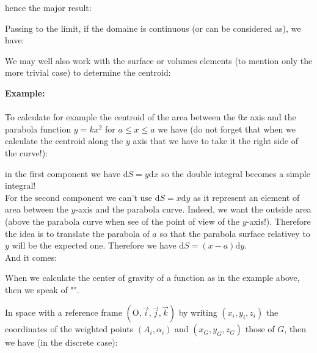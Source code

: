 	hence the major result:
	
	Passing to the limit, if the domaine is continuous (or can be considered as), we have:
	
	We may well also work with the surface or volumes elements (to mention only the more trivial case) to determine the centroid:
	
	\begin{tcolorbox}[colframe=black,colback=white,sharp corners]
	\textbf{{\Large {}}Example:}\\\\
	To calculate for example the centroid of the area between the 0$x$ axis and the parabola function $y=kx^2$ for $a\leq x\leq a$ we have (do not forget that when we calculate the centroid along the $y$ axis that we have to take it the right side of the curve!):
	
	in the first component we have $\mathrm{d}S=y\mathrm{d}x$ so the double integral becomes a simple integral!\\
	
	For the second component we can't use $\mathrm{d}S=x\mathrm{d}y$ as it represent an element of area between the $y$-axis and the parabola curve. Indeed, we want the outside area (above the parabola curve when see of the point of view of the $y$-axis!). Therefore the idea is to translate the parabola of $a$ so that the parabola surface relativey to $y$ will be the expected one. Therefore we have $\mathrm{d}S=(x-a)\mathrm{d}y$.\\
	
	And it comes:
	
	\end{tcolorbox}
	\begin{tcolorbox}[title=Remark,colframe=black,arc=10pt]
	When we calculate the center of gravity of a function as in the example above, then we speak of "".
	\end{tcolorbox}
	In space with a reference frame $(\text{O},\vec{i},\vec{j},\vec{k})$ by writing $(x_i,y_i,z_i)$ the coordinates of the weighted points 
$(A_i,\alpha_i)$ and $(x_G,y_G,z_G)$ those of $G$, then we have (in the discrete case):
	
